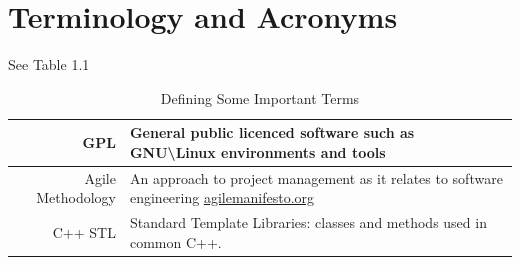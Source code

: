\section{Terminology and Acronyms}

See Table 1.1
\begin{table}[tbh]
\begin{center}
\begin{tabular}{|r|l|}
\hline
    GPL & General public licenced software such as GNU\textbackslash Linux environments and tools \\ \hline
    Agile Methodology & An approach to project management as it relates to software engineering \url{agilemanifesto.org} \\ \hline
    C++  STL & Standard Template Libraries: classes and methods used in common C++. \\
    \hline
\end{tabular}
\caption{Defining Some Important Terms \label{terms}}
\end{center}
\end{table}